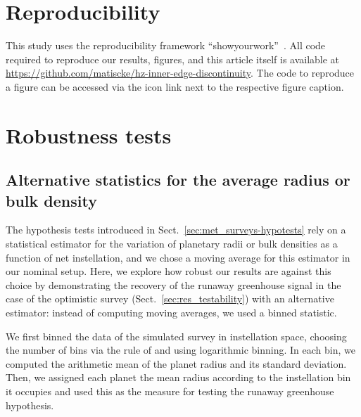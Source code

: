 \documentclass[twocolumn,twocolappendix,linenumbers]{aastex631}
\begin{document}
\section*{Reproducibility}
This study uses the reproducibility framework ``showyourwork''~\citep{Luger2021}.
All code required to reproduce our results, figures, and this article itself is available at \url{https://github.com/matiscke/hz-inner-edge-discontinuity}.
The code to reproduce a figure can be accessed via the icon link next to the respective figure caption.




\appendix
\section{Robustness tests}
\subsection{Alternative statistics for the average radius or bulk density}\label{app:binnedstats}
The hypothesis tests introduced in Sect.~\ref{sec:met_surveys-hypotests} rely on a statistical estimator for the variation of planetary radii or bulk densities as a function of net instellation, and we chose a moving average for this estimator in our nominal setup.
Here, we explore how robust our results are against this choice by demonstrating the recovery of the runaway greenhouse signal in the case of the optimistic survey (Sect.~\ref{sec:res_testability}) with an alternative estimator: instead of computing moving averages, we used a binned statistic.

We first binned the data of the simulated survey in instellation space, choosing the number of bins via the rule of \citet{Freedman1981} and using logarithmic binning.
In each bin, we computed the arithmetic mean of the planet radius and its standard deviation.
Then, we assigned each planet the mean radius according to the instellation bin it occupies and used this as the measure for testing the runaway greenhouse hypothesis.
\end{document}
